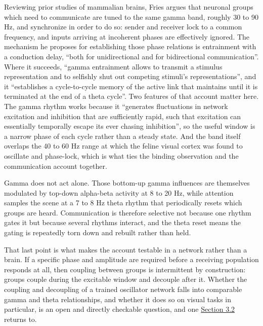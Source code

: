 \documentclass[a4paper,fleqn]{cas-sc}
\begin{document}
Reviewing prior studies of mammalian brains, Fries argues that neuronal
groups which need to communicate are tuned to the same gamma band,
roughly 30 to 90 Hz, and synchronize in order to do so: sender and
receiver lock to a common frequency, and inputs arriving at incoherent
phases are effectively ignored. The mechanism he proposes for
establishing those phase relations is entrainment with a conduction
delay, ``both for unidirectional and for bidirectional communication''.
Where it succeeds, ``gamma entrainment allows to transmit a stimulus
representation and to selfishly shut out competing stimuli's
representations'', and it ``establishes a cycle-to-cycle memory of the
active link that maintains until it is terminated at the end of a theta
cycle''. Two features of that account matter here. The gamma rhythm
works because it ``generates fluctuations in network excitation and
inhibition that are sufficiently rapid, such that excitation can
essentially temporally escape its ever chasing inhibition'', so the
useful window is a narrow phase of each cycle rather than a steady
state. And the band itself overlaps the 40 to 60 Hz range at which the
feline visual cortex was found to oscillate and phase-lock, which is
what ties the binding observation and the communication account
together.

Gamma does not act alone. Those bottom-up gamma influences are
themselves modulated by top-down alpha-beta activity at 8 to 20 Hz,
while attention samples the scene at a 7 to 8 Hz theta rhythm that
periodically resets which groups are heard. Communication is therefore
selective not because one rhythm gates it but because several rhythms
interact, and the theta reset means the gating is repeatedly torn down
and rebuilt rather than held.

That last point is what makes the account testable in a network rather
than a brain. If a specific phase and amplitude are required before a
receiving population responds at all, then coupling between groups is
intermittent by construction: groups couple during the excitable window
and decouple after it. Whether the coupling and decoupling of a trained
oscillator network falls into comparable gamma and theta relationships,
and whether it does so on visual tasks in particular, is an open and
directly checkable question, and one \hyperref[sec-3-2]{Section 3.2}
returns to.
\end{document}
